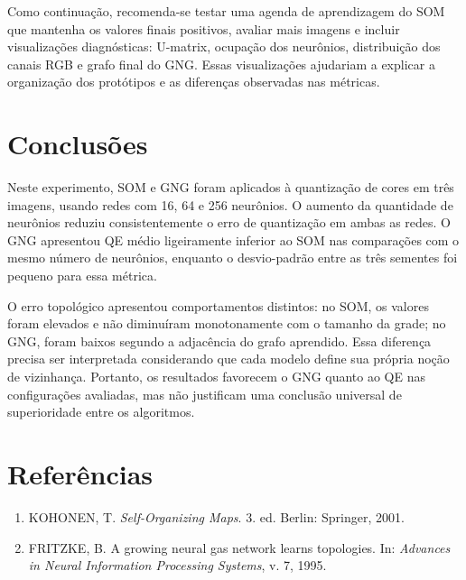 \documentclass[11pt,a4paper]{article}
\begin{document}
Como continuação, recomenda-se testar uma agenda de aprendizagem do SOM que
mantenha os valores finais positivos, avaliar mais imagens e incluir
visualizações diagnósticas: U-matrix, ocupação dos neurônios, distribuição dos
canais RGB e grafo final do GNG. Essas visualizações ajudariam a explicar a
organização dos protótipos e as diferenças observadas nas métricas.

\section{Conclusões}

Neste experimento, SOM e GNG foram aplicados à quantização de cores em três
imagens, usando redes com 16, 64 e 256 neurônios. O aumento da quantidade de
neurônios reduziu consistentemente o erro de quantização em ambas as redes. O
GNG apresentou QE médio ligeiramente inferior ao SOM nas comparações com o
mesmo número de neurônios, enquanto o desvio-padrão entre as três sementes foi
pequeno para essa métrica.

O erro topológico apresentou comportamentos distintos: no SOM, os valores
foram elevados e não diminuíram monotonamente com o tamanho da grade; no GNG,
foram baixos segundo a adjacência do grafo aprendido. Essa diferença precisa
ser interpretada considerando que cada modelo define sua própria noção de
vizinhança. Portanto, os resultados favorecem o GNG quanto ao QE nas
configurações avaliadas, mas não justificam uma conclusão universal de
superioridade entre os algoritmos.

\section*{Referências}

\begin{enumerate}
\item KOHONEN, T. \textit{Self-Organizing Maps}. 3. ed. Berlin: Springer, 2001.
\item FRITZKE, B. A growing neural gas network learns topologies. In:
\textit{Advances in Neural Information Processing Systems}, v. 7, 1995.
\end{enumerate}
\end{document}
